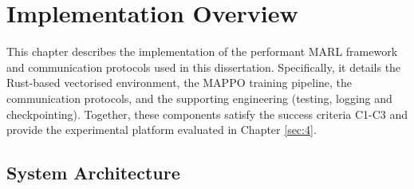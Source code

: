 \label{sec:3}

\section{Implementation Overview}
\label{sec:3.1}

This chapter describes the implementation of the performant MARL framework and communication protocols used in this dissertation.
Specifically, it details the Rust-based vectorised environment, the MAPPO training pipeline, the communication protocols, and the supporting engineering (testing, logging and checkpointing).
Together, these components satisfy the success criteria C1-C3 and provide the experimental platform evaluated in Chapter \ref{sec:4}.

\subsection{System Architecture}
\label{sec:3.1.1}

